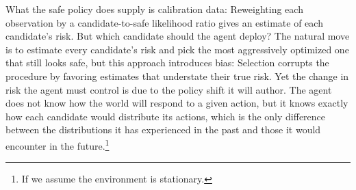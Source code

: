   What the safe policy does supply is calibration data: Reweighting each observation by a candidate-to-safe likelihood ratio gives an estimate of each candidate's risk.
  But which candidate should the agent deploy?
  The natural move is to estimate every candidate's risk and pick the most aggressively optimized one that still looks safe, but this approach introduces bias: Selection corrupts the procedure by favoring estimates that understate their true risk.
  Yet the change in risk the agent must control is due to the policy shift it will author.
  The agent does not know how the world will respond to a given action, but it knows exactly how each candidate would distribute its actions, which is the only difference between the distributions it has experienced in the past and those it would encounter in the future.\footnote{If we assume the environment is stationary.}
  

